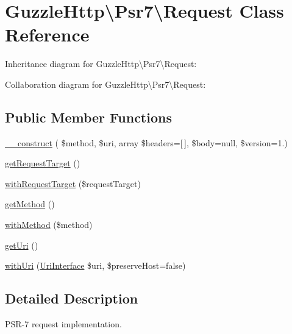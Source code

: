 \hypertarget{classGuzzleHttp_1_1Psr7_1_1Request}{}\section{Guzzle\+Http\textbackslash{}Psr7\textbackslash{}Request Class Reference}
\label{classGuzzleHttp_1_1Psr7_1_1Request}


Inheritance diagram for Guzzle\+Http\textbackslash{}Psr7\textbackslash{}Request\+:


Collaboration diagram for Guzzle\+Http\textbackslash{}Psr7\textbackslash{}Request\+:
\subsection*{Public Member Functions}
\begin{DoxyCompactItemize}
\item 
\hyperlink{classGuzzleHttp_1_1Psr7_1_1Request_a8bd33252542f61704d4ca5af5cd81ad3}{\+\_\+\+\_\+construct} ( \$method, \$uri, array \$headers=\mbox{[}$\,$\mbox{]}, \$body=null, \$version=\textquotesingle{}1.\textquotesingle{})
\item 
\hyperlink{classGuzzleHttp_1_1Psr7_1_1Request_a0dae2eaf80f250109b69b9e7fb504b3c}{get\+Request\+Target} ()
\item 
\hyperlink{classGuzzleHttp_1_1Psr7_1_1Request_aa05ac6946c5b3f50b5b136142ccf193f}{with\+Request\+Target} (\$request\+Target)
\item 
\hyperlink{classGuzzleHttp_1_1Psr7_1_1Request_a4eafa27a3768e0d353882e9aad075709}{get\+Method} ()
\item 
\hyperlink{classGuzzleHttp_1_1Psr7_1_1Request_a6e111abeaf2e319e31599bb97c4111fa}{with\+Method} (\$method)
\item 
\hyperlink{classGuzzleHttp_1_1Psr7_1_1Request_a79d73a7f5e75d671a379ee95e3692a1e}{get\+Uri} ()
\item 
\hyperlink{classGuzzleHttp_1_1Psr7_1_1Request_a1eb2a7b7048ec8b1e10ae535709f6917}{with\+Uri} (\hyperlink{interfacePsr_1_1Http_1_1Message_1_1UriInterface}{Uri\+Interface} \$uri, \$preserve\+Host=false)
\end{DoxyCompactItemize}


\subsection{Detailed Description}
P\+S\+R-\/7 request implementation. 

